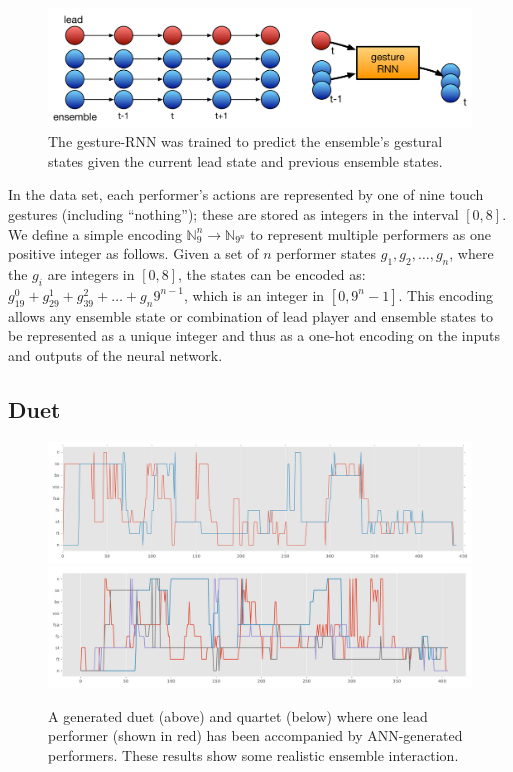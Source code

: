 \documentclass[sigchi]{acmart} %
\begin{document}
\begin{figure}
  \includegraphics[width=\columnwidth]{nn-ensemble-training}
  \caption{The gesture-RNN was trained to predict the ensemble's
    gestural states given the current lead state and previous ensemble
    states.}\label{fig:nn-ensemble-training}
\end{figure}

In the data set, each performer's actions are represented by one of
nine touch gestures (including ``nothing''); these are stored as
integers in the interval $[0,8]$. We define a simple encoding
$\mathbb{N}_{9}^n \rightarrow \mathbb{N}_{9^n}$ to represent multiple
performers as one positive integer as follows. Given a set of $n$
performer states $g_1, g_2, \ldots, g_n$, where the $g_i$ are integers
in $[0,8]$, the states can be encoded as:
$ g_19^0 + g_29^1 + g_39^2 + \ldots + g_n9^{n-1} $, which is an integer
in $[0,9^n - 1]$.
This encoding allows any ensemble state or combination of lead player
and ensemble states to be represented as a unique integer and thus as
a one-hot encoding on the inputs and outputs of the neural network.

\subsection{Duet}

\begin{figure}
  \centering
  \includegraphics[width=\columnwidth]{duet-performance-512n-30ep-14.pdf}
  \includegraphics[width=\columnwidth]{gesture-rnn-4to3-512n3l-perf-102.pdf}
  \caption{A generated duet (above) and quartet (below) where one lead
    performer (shown in red) has been accompanied by ANN-generated
    performers. These results
    show some realistic ensemble interaction.}\label{fig:model-examples}
\end{figure}
\end{document}
